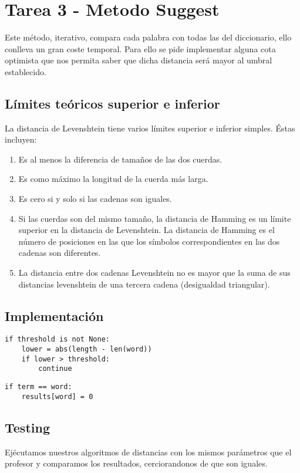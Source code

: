 \section{Tarea 3 - Metodo Suggest}

Este método, iterativo, compara cada palabra con todas las del diccionario, ello conlleva un gran coste temporal.
Para ello se pide implementar alguna cota optimista que nos permita saber que dicha distancia será
mayor al umbral establecido.

\subsection{Límites teóricos superior e inferior}
La distancia de Levenshtein tiene varios límites superior e inferior simples. Éstas incluyen:
\begin{enumerate}
    \item Es al menos la diferencia de tamaños de las dos cuerdas.
    \item Es como máximo la longitud de la cuerda más larga.
    \item Es cero si y solo si las cadenas son iguales.
    \item Si las cuerdas son del mismo tamaño, la distancia de Hamming es un límite superior en la distancia de Levenshtein. La distancia de Hamming es el número de posiciones en las que los símbolos correspondientes en las dos cadenas son diferentes.
    \item La distancia entre dos cadenas Levenshtein no es mayor que la suma de sus distancias levenshtein de una tercera cadena (desigualdad triangular).
\end{enumerate}

\subsection{Implementación}

\begin{lstlisting}[caption=Condición 1]
if threshold is not None:
    lower = abs(length - len(word))
    if lower > threshold:
        continue
\end{lstlisting}

\begin{lstlisting}[caption=Condición 3]
if term == word:
    results[word] = 0
\end{lstlisting}

\subsection{Testing}
Ejécutamos nuestros algoritmos de distancias con los mismos parámetros que el profesor y comparamos los resultados, cerciorandonos de que son iguales.

\newpage 